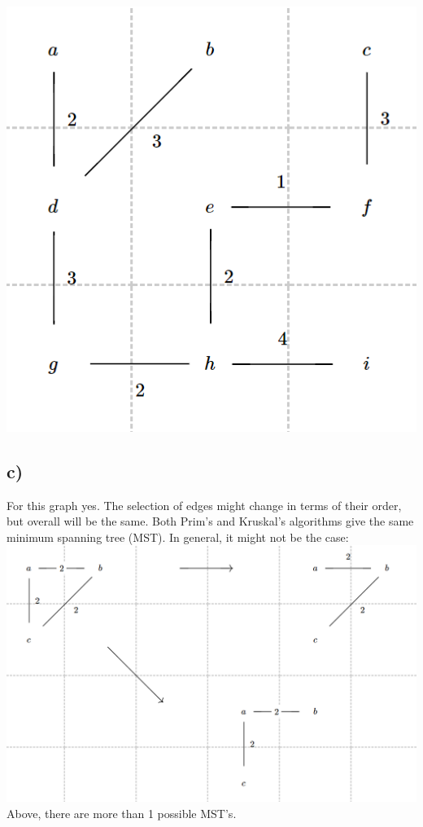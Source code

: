\documentclass[11pt]{article}
\begin{document}
\includegraphics{graph_1}

\pagebreak
\subsection*{c)}

	For this graph yes. The selection of edges might change in terms of their order, but overall will be the same. 
	Both Prim's and Kruskal's algorithms give the same minimum spanning tree (MST).
	In general, it might not be the case: \\
	\includegraphics[scale=0.7]{graph_2}
	\\
	Above, there are more than 1 possible MST's.
	
\end{document}
